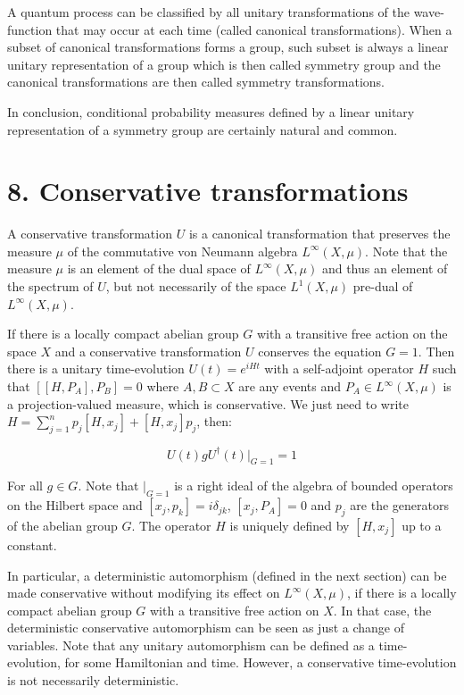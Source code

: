 \documentclass[11pt]{book}
\begin{document}
A quantum process can be classified by all unitary transformations of
the wave-function that may occur at each time (called canonical
transformations). When a subset of canonical transformations forms a
group, such subset is always a linear unitary representation of a group
which is then called symmetry group and the canonical transformations
are then called symmetry transformations.

In conclusion, conditional probability measures defined by a linear
unitary representation of a symmetry group are certainly natural and
common.

\hypertarget{conservative-transformations}{%
\section{8. Conservative
transformations}\label{conservative-transformations}}

A conservative transformation \(U\) is a canonical transformation that
preserves the measure \(\mu\) of the commutative von Neumann algebra
\(L^\infty(X,\mu)\). Note that the measure \(\mu\) is an element of the
dual space of \(L^\infty(X,\mu)\) and thus an element of the spectrum of
\(U\), but not necessarily of the space \(L^1(X,\mu)\) pre-dual of
\(L^\infty(X,\mu)\).

If there is a locally compact abelian group \(G\) with a transitive free
action on the space \(X\) and a conservative transformation \(U\)
conserves the equation \(G=1\). Then there is a unitary time-evolution
\(U(t)=e^{iH t}\) with a self-adjoint operator \(H\) such that
\([[H,P_A],P_B]=0\) where \(A,B\subset X\) are any events and
\(P_A\in  L^\infty(X,\mu)\) is a projection-valued measure, which is
conservative. We just need to write
\(H=\sum\limits_{j=1}^{n}p_j[H,x_j]+[H,x_j]p_j\), then:

\begin{equation}U(t)g U^\dagger(t)|_{G=1}=1\end{equation}

For all \(g\in G\). Note that \(|_{G=1}\) is a right ideal of the
algebra of bounded operators on the Hilbert space and
\([x_j,p_k]=i\delta_{jk}\), \([x_j,P_A]=0\) and \(p_j\) are the
generators of the abelian group \(G\). The operator \(H\) is uniquely
defined by \([H,x_j]\) up to a constant.

In particular, a deterministic automorphism (defined in the next
section) can be made conservative without modifying its effect on
\(L^\infty(X,\mu)\), if there is a locally compact abelian group \(G\)
with a transitive free action on \(X\). In that case, the deterministic
conservative automorphism can be seen as just a change of variables.
Note that any unitary automorphism can be defined as a time-evolution,
for some Hamiltonian and time. However, a conservative time-evolution is
not necessarily deterministic.
\end{document}
